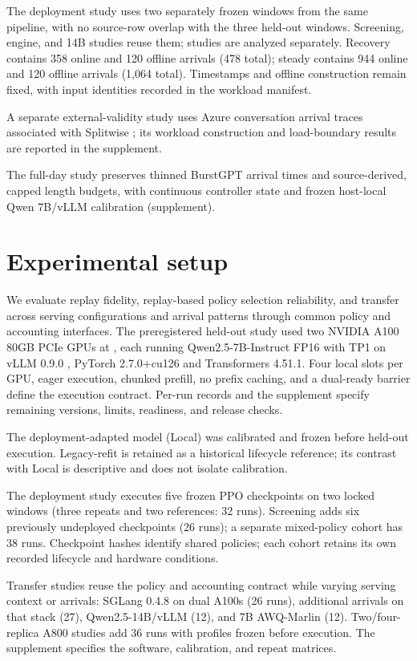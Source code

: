 The deployment study uses two separately frozen windows from the same pipeline,
with no source-row overlap with the three held-out windows. Screening, engine,
and 14B studies reuse them; studies are analyzed separately. Recovery contains
358 online and 120 offline arrivals (478 total); steady contains 944 online
and 120 offline arrivals (1,064 total). Timestamps and offline construction
remain fixed, with input identities recorded in the workload manifest.

A separate external-validity study uses Azure conversation arrival traces
associated with Splitwise \citep{patel2024splitwise}; its workload construction
and load-boundary results are reported in the supplement.

The full-day study preserves thinned BurstGPT arrival times and source-derived,
capped length budgets, with continuous controller state and frozen host-local
Qwen 7B/vLLM calibration (supplement).

\section{Experimental setup}
We evaluate replay fidelity, replay-based policy selection reliability, and
transfer across serving configurations and arrival patterns through common
policy and accounting interfaces.
The preregistered held-out study used two NVIDIA A100 80GB PCIe GPUs at
\experimentfacility{}, each running Qwen2.5-7B-Instruct FP16 with TP1 on
vLLM 0.9.0 \citep{kwon2023vllm}, PyTorch 2.7.0+cu126 and Transformers 4.51.1.
Four local slots per GPU, eager execution, chunked prefill, no prefix caching,
and a dual-ready barrier define the execution contract. Per-run records and
the supplement specify remaining versions, limits, readiness, and release checks.

The deployment-adapted model (Local) was calibrated and frozen before
held-out execution. Legacy-refit is retained as a historical lifecycle
reference; its contrast with Local is descriptive and does not isolate
calibration.

The deployment study executes five frozen PPO checkpoints on two locked
windows (three repeats and two references: 32 runs). Screening adds six
previously undeployed checkpoints (26 runs); a separate mixed-policy cohort
has 38 runs. Checkpoint hashes identify shared policies; each cohort retains
its own recorded lifecycle and hardware conditions.

Transfer studies reuse the policy and accounting contract while varying
serving context or arrivals: SGLang 0.4.8 on dual A100s (26 runs), additional arrivals
on that stack (27), Qwen2.5-14B/vLLM (12), and 7B AWQ-Marlin (12).
Two/four-replica A800 studies add 36 runs with profiles frozen before execution.
The supplement specifies the software, calibration, and repeat matrices.

